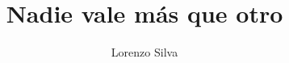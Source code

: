 \documentclass[fontsize=11pt]{scrartcl}
\begin{document}
\title{Nadie vale más que otro}
\author{Lorenzo Silva}
\date{}

\maketitle
\clearpage

\parskip0pt


\newcommand{\sidenote}[1]{\marginpar[#1]{\small\textit{#1}}}
\newcommand{\grammarnote}[1]{\marginpar[#1]{\footnotesize{G#1}}}
\newcommand{\ul}[1]{\underline{#1}}
\newcommand{\nwfootnote}[1]{\footnote{#1}}
\newcommand{\fillmiss}{\rule{2cm}{0.4pt}~}
\newcommand{\choice}{$\Box$}
\newcommand{\correctchoice}{\framebox[1em]{\ding{51}}}
\newcommand{\falsechoice}{\framebox[1em]{\ding{53}}}
\newcommand{\correction}[1]{~\ding{43}~\textbf{\textsl{#1}}}
\newcommand{\FIN}{\textbf{--- FIN ---}\clearpage}

\newcommand{\mdash}{-}

\begin{paracol}{2}

\end{paracol}


\setlength{\parindent}{0em}

\raggedright

\end{document}
